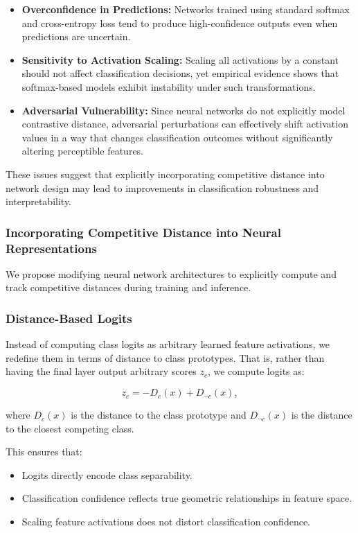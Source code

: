 \documentclass[12pt]{article}
\begin{document}
\begin{itemize}
    \item \textbf{Overconfidence in Predictions:} Networks trained using standard softmax and cross-entropy loss tend to produce high-confidence outputs even when predictions are uncertain.
    \item \textbf{Sensitivity to Activation Scaling:} Scaling all activations by a constant should not affect classification decisions, yet empirical evidence shows that softmax-based models exhibit instability under such transformations.
    \item \textbf{Adversarial Vulnerability:} Since neural networks do not explicitly model contrastive distance, adversarial perturbations can effectively shift activation values in a way that changes classification outcomes without significantly altering perceptible features.
\end{itemize}

These issues suggest that explicitly incorporating competitive distance into network design may lead to improvements in classification robustness and interpretability.

\subsubsection{Incorporating Competitive Distance into Neural Representations}

We propose modifying neural network architectures to explicitly compute and track competitive distances during training and inference.

\subsubsection{Distance-Based Logits}

Instead of computing class logits as arbitrary learned feature activations, we redefine them in terms of distance to class prototypes. That is, rather than having the final layer output arbitrary scores \( z_c \), we compute logits as:

\[
z_c = -D_c(x) + D_{\neg c}(x),
\]

where \( D_c(x) \) is the distance to the class prototype and \( D_{\neg c}(x) \) is the distance to the closest competing class.

This ensures that:

\begin{itemize}
    \item Logits directly encode class separability.
    \item Classification confidence reflects true geometric relationships in feature space.
    \item Scaling feature activations does not distort classification confidence.
\end{itemize}
\end{document}
